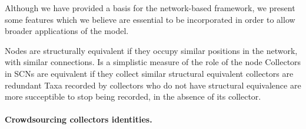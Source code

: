 
Although we have provided a basis for the network-based framework, we present some features which we believe are essential to be incorporated in order to allow broader applications of the model.



Nodes are structurally equivalent if they occupy similar positions in the network, with similar connections.
Is a simplistic measure of the role of the node
Collectors in SCNs are equivalent if they collect similar 
structural equivalent collectors are redundant
Taxa recorded by collectors who do not have structural equivalence are more succeptible to stop being recorded, in the absence of its collector.


\paragraph*{Crowdsourcing collectors identities.}


